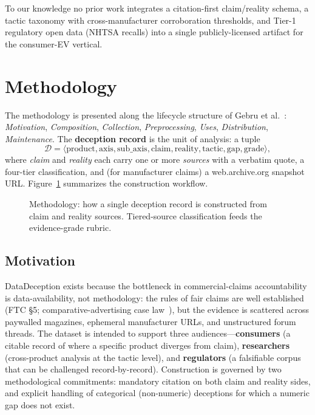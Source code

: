 \documentclass{article}
\begin{document}
To our knowledge no prior work integrates a citation-first claim/reality schema, a tactic taxonomy with cross-manufacturer corroboration thresholds, and Tier-1 regulatory open data (NHTSA recalls) into a single publicly-licensed artifact for the consumer-EV vertical.

\section{Methodology}\label{sec:methodology}

The methodology is presented along the lifecycle structure of Gebru et al.~\cite{gebru_datasheets_2021}: \emph{Motivation}, \emph{Composition}, \emph{Collection}, \emph{Preprocessing}, \emph{Uses}, \emph{Distribution}, \emph{Maintenance}. The \textbf{deception record} is the unit of analysis: a tuple
\[
\mathcal{D} = \langle \text{product}, \text{axis}, \text{sub\_axis}, \text{claim}, \text{reality}, \text{tactic}, \text{gap}, \text{grade} \rangle,
\]
where \emph{claim} and \emph{reality} each carry one or more \emph{sources} with a verbatim quote, a four-tier classification, and (for manufacturer claims) a web.archive.org snapshot URL. Figure~\ref{fig:method-flow} summarizes the construction workflow.

\begin{figure}[!htbp]
\centering

\caption{Methodology: how a single deception record is constructed from claim and reality sources. Tiered-source classification feeds the evidence-grade rubric.}
\label{fig:method-flow}
\end{figure}

\subsection{Motivation}\label{sec:motivation}

DataDeception exists because the bottleneck in commercial-claims accountability is data-availability, not methodology: the rules of fair claims are well established (FTC \S 5; comparative-advertising case law~\cite{ftc_kraft_1991, ftc_intuit_2026}), but the evidence is scattered across paywalled magazines, ephemeral manufacturer URLs, and unstructured forum threads. The dataset is intended to support three audiences---\textbf{consumers} (a citable record of where a specific product diverges from claim), \textbf{researchers} (cross-product analysis at the tactic level), and \textbf{regulators} (a falsifiable corpus that can be challenged record-by-record). Construction is governed by two methodological commitments: mandatory citation on both claim and reality sides, and explicit handling of categorical (non-numeric) deceptions for which a numeric gap does not exist.
\end{document}
